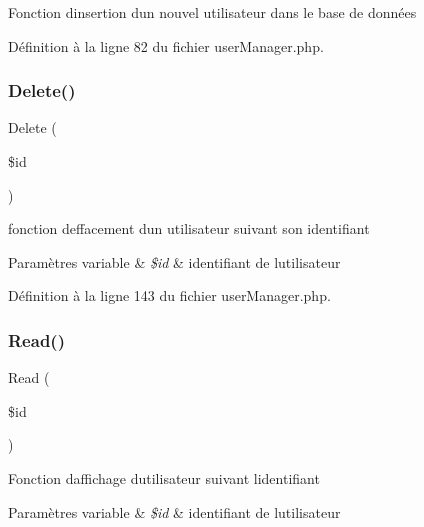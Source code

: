 Fonction d\textquotesingle{}insertion d\textquotesingle{}un nouvel utilisateur dans le base de données 

Définition à la ligne 82 du fichier user\+Manager.\+php.

\mbox{\label{class_src_1_1_managers_1_1user_manager_a59113b5ecd1d155db6a4f30af34a1e80}} 
\subsubsection{\texorpdfstring{Delete()}{Delete()}}
{\footnotesize\ttfamily Delete (\begin{DoxyParamCaption}\item[{}]{\$id }\end{DoxyParamCaption})}

fonction d\textquotesingle{}effacement d\textquotesingle{}un utilisateur suivant son identifiant 
\begin{DoxyParams}[1]{Paramètres}
variable & {\em \$id} & identifiant de l\textquotesingle{}utilisateur \\
\hline
\end{DoxyParams}


Définition à la ligne 143 du fichier user\+Manager.\+php.

\mbox{\label{class_src_1_1_managers_1_1user_manager_ad2bbc9b3130abdfe3a9fc9e9fe36716f}} 
\subsubsection{\texorpdfstring{Read()}{Read()}}
{\footnotesize\ttfamily Read (\begin{DoxyParamCaption}\item[{}]{\$id }\end{DoxyParamCaption})}

Fonction d\textquotesingle{}affichage d\textquotesingle{}utilisateur suivant l\textquotesingle{}identifiant 
\begin{DoxyParams}[1]{Paramètres}
variable & {\em \$id} & identifiant de l\textquotesingle{}utilisateur \\
\hline
\end{DoxyParams}


